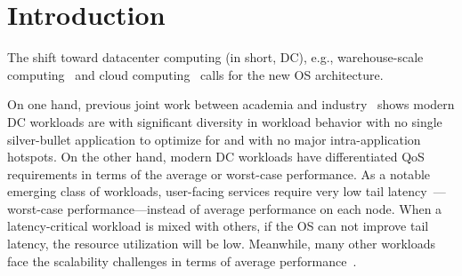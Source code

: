 \documentclass[pageno]{jpaper}
\begin{document}
\section{Introduction} \label{section_introduction}



























































The shift  toward datacenter computing (in short, DC), e.g., warehouse-scale computing~\cite{barroso2009datacenter, barroso2013datacenter} and cloud computing~\cite{shue2012performance, sekar2011verifiable, agmon2012resource, mogul2013nic, kooburat2011best, Madhavapeddy:2013:ULO:2451116.2451167} calls for the new OS architecture.

  On one hand, previous joint work between academia and industry~\cite{kanev2015profiling} shows modern DC workloads are with significant diversity
in workload behavior with no single silver-bullet application to optimize for and with no major intra-application hotspots.
  On the other hand,   modern DC workloads have differentiated QoS requirements in terms of  the average  or worst-case performance.
 As a notable emerging class of workloads, user-facing services require very low tail latency~\cite{dean2013tail, kasture2014ubik, janapa2010web}---worst-case performance---instead of average performance on each node.
When a latency-critical workload is mixed with others, if the OS can not improve tail latency, the resource utilization will be low.
Meanwhile, many other workloads face the  scalability challenges in terms of average performance~\cite{unrau1995hierarchical, gough2007kernel, guniguntala2008read, mellor1991algorithms, russinovich2008inside, clements2015scalable, Baumann:2009:multikernel}.
\end{document}
